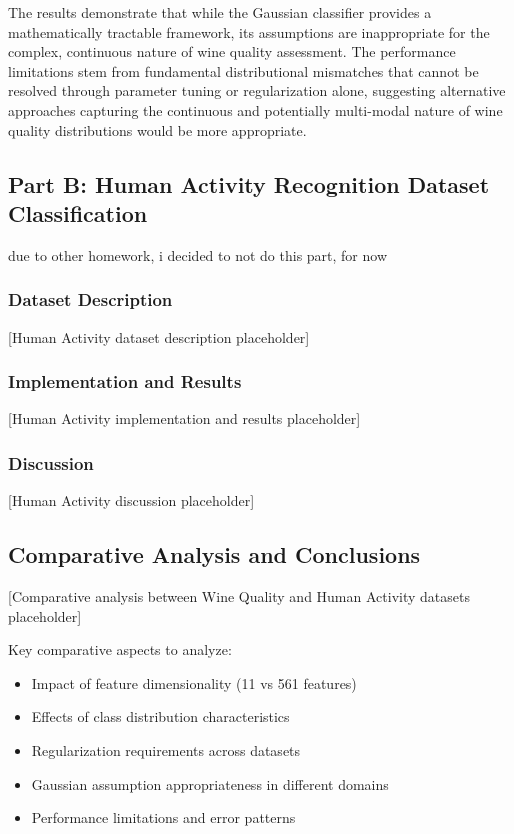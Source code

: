 \documentclass[12pt]{article}
\begin{document}
The results demonstrate that while the Gaussian classifier provides a mathematically tractable framework, its assumptions are inappropriate for the complex, continuous nature of wine quality assessment. The performance limitations stem from fundamental distributional mismatches that cannot be resolved through parameter tuning or regularization alone, suggesting alternative approaches capturing the continuous and potentially multi-modal nature of wine quality distributions would be more appropriate.


\subsection{Part B: Human Activity Recognition Dataset Classification}
 due to other homework, i decided to not do this part, for now
\subsubsection{Dataset Description}
[Human Activity dataset description placeholder]

\subsubsection{Implementation and Results}
[Human Activity implementation and results placeholder]

\subsubsection{Discussion}
[Human Activity discussion placeholder]


\subsection{Comparative Analysis and Conclusions}

[Comparative analysis between Wine Quality and Human Activity datasets placeholder]

Key comparative aspects to analyze:
\begin{itemize}
\item Impact of feature dimensionality (11 vs 561 features)
\item Effects of class distribution characteristics
\item Regularization requirements across datasets
\item Gaussian assumption appropriateness in different domains
\item Performance limitations and error patterns
\end{itemize}
\end{document}
